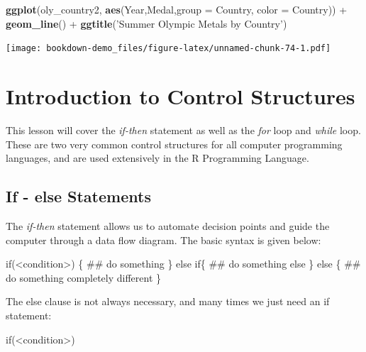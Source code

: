 \documentclass[]{book}
\newenvironment{Shaded}{\begin{snugshade}}{\end{snugshade}}
\newcommand{\KeywordTok}[1]{\textcolor[rgb]{0.13,0.29,0.53}{\textbf{{#1}}}}
\newcommand{\DataTypeTok}[1]{\textcolor[rgb]{0.13,0.29,0.53}{{#1}}}
\newcommand{\StringTok}[1]{\textcolor[rgb]{0.31,0.60,0.02}{{#1}}}
\newcommand{\NormalTok}[1]{{#1}}
\begin{document}
\begin{Shaded}
\begin{Highlighting}[]
\KeywordTok{ggplot}\NormalTok{(oly_country2, }\KeywordTok{aes}\NormalTok{(Year,Medal,}\DataTypeTok{group =} \NormalTok{Country, }\DataTypeTok{color =} \NormalTok{Country)) +}\StringTok{ }\KeywordTok{geom_line}\NormalTok{() +}\StringTok{ }\KeywordTok{ggtitle}\NormalTok{(}\StringTok{'Summer Olympic Metals by Country'}\NormalTok{)}
\end{Highlighting}
\end{Shaded}

\texttt{[image: bookdown-demo\_files/figure-latex/unnamed-chunk-74-1.pdf]}

\chapter{Introduction to Control
Structures}\label{introduction-to-control-structures}

This lesson will cover the \emph{if-then} statement as well as the
\emph{for} loop and \emph{while} loop. These are two very common control
structures for all computer programming languages, and are used
extensively in the R Programming Language.

\section{If - else Statements}\label{if---else-statements}

The \emph{if-then} statement allows us to automate decision points and
guide the computer through a data flow diagram. The basic syntax is
given below:

\begin{Shaded}
\begin{Highlighting}[]
\NormalTok{if(<condition>) \{}
  \NormalTok{## do something}
\NormalTok{\} else if\{}
  \NormalTok{## do something else}
\NormalTok{\} else \{}
  \NormalTok{## do something completely different}
\NormalTok{\}}
\end{Highlighting}
\end{Shaded}

The else clause is not always necessary, and many times we just need an
if statement:

\begin{Shaded}
\begin{Highlighting}[]
\NormalTok{if(<condition>)}
\end{Highlighting}
\end{Shaded}
\end{document}
